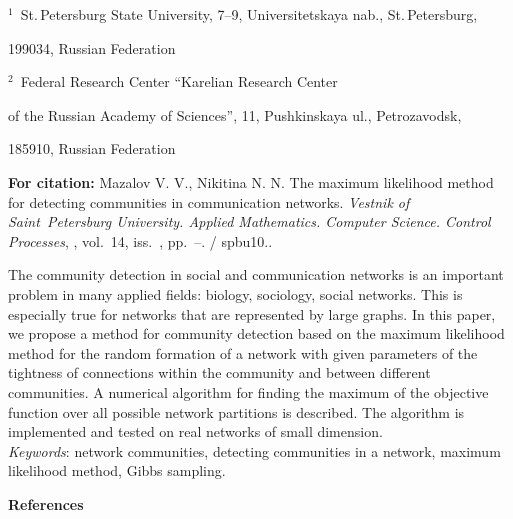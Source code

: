 
{\normalsize

\vskip 6mm


}

\vskip 2mm

{\small


\vskip 2mm

{\footnotesize

\noindent $^1$~St.\,Petersburg State University, 7--9,
Universitetskaya nab., St.\,Petersburg, %

\noindent\hskip2.45mm 199034, Russian Federation

\noindent $^2$~Federal Research Center ``Karelian Research Center %

\noindent\hskip2.45mm of the Russian Academy of Sciences'', 11,
Pushkinskaya ul., Petrozavodsk,


\noindent\hskip2.45mm 185910, Russian Federation


}

\vskip3mm

\noindent \textbf{For citation:}  Mazalov V. V., Nikitina N. N.
The maximum likelihood method for detecting commu\-nities in
communication networks. {\it Vestnik of Saint~Petersburg
University. Applied Mathematics. Computer Science. Control
Processes}, \issueyear, vol.~14, iss.~\issuenum,
pp.~\pageref{p2}--\pageref{p2e}.
\doivyp/\enskip%
\!\!\!spbu10.\issueyear.

\vskip3mm

{\leftskip=7mm\noindent The community detection in social and communication
networks is an important problem in many applied fields: biology, sociology,
social networks. This is especially true for networks that are represented by
large graphs. In this paper, we propose a method for community detection based
on the maximum likelihood method for the random formation of a network with
given parameters of the tightness of connections within the community and
between different communities.  A numerical algorithm for finding the maximum
of the objective function over all possible network partitions is described.
The algorithm is implemented and tested on real networks of small dimension.%
\\[1mm]
\textit{Keywords}: network communities, detecting communities in a
network, maximum likelihood method, Gibbs sampling.
\par}

\vskip5mm

\noindent \textbf{References} }

